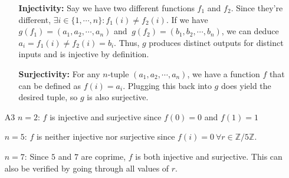 \documentclass[12pt]{article}
\begin{document}
\begin{itemize}
\begin{enumerate}[label=\alph*]
                        \textbf{Injectivity:}
                        Say we have two different functions $f_1$ and $f_2$.
                        Since they're different, $\exists i \in \{1, \cdots , n\}: f_1(i) \ne f_2(i)$.
                        If we have $g(f_1)=(a_1, a_2, \cdots , a_n)$ and $~{g(f_2)=(b_1, b_2, \cdots , b_n)}$,
                        we can deduce $a_i=f_1(i) \ne f_2(i)=b_i$.
                        Thus, $g$ produces distinct outputs for distinct inputs and is injective by definition.

                        \textbf{Surjectivity:}
                        For any $n$-tuple $(a_1, a_2, \cdots , a_n)$,
                        we have a function $f$ that can be defined as $f(i)=a_i$.
                        Plugging this back into $g$ does yield the desired tuple, so $g$ is also surjective.
            \end{enumerate}
      \item[A3] $n=2$: $f$ is injective and surjective since $f(0)=0$ and $f(1)=1$

            $n=5$: $f$ is neither injective nor surjective since $f(i)=0\ \forall r \in \mathbb{Z}/5\mathbb{Z}$.

            $n=7$: Since $5$ and $7$ are coprime, $f$ is both injective and surjective.
            This can also be verified by going through all values of $r$.
\end{itemize}
\end{document}
